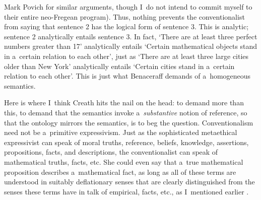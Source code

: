 \begin{artengenv}{Mark Povich}
\parencite*[][]{hale_reasons_2001} %
 for similar arguments, though I~do not intend to commit myself to their entire neo-Fregean program). Thus, nothing prevents the conventionalist from saying that sentence 2 has the logical form of sentence 3. This is analytic; sentence 2 analytically entails sentence 3. In fact, ‘There are at least three perfect numbers greater than 17' analytically entails ‘Certain mathematical objects stand in a~certain relation to each other', just as ‘There are at least three large cities older than New York' analytically entails ‘Certain cities stand in a~certain relation to each other'. This is just what Benaceraff demands of a~homogeneous semantics.

Here is where I~think Creath
\parencite*[][]{creath_benacerraf_1980} %
 hits the nail on the head: to demand more than this, to demand that the semantics invoke a~\textit{substantive} notion of reference, so that the ontology mirrors the semantics, is to beg the question. Conventionalism need not be a~primitive expressivism. Just as the sophisticated metaethical expressivist 
\parencites[e.g.,][]{blackburn_essays_1993}{kalderon_quasi-realism_2005}
 can speak of moral truths, reference, beliefs, knowledge, assertions, propositions, facts, and descriptions, the conventionalist can speak of mathematical truths, facts, etc. She could even say that a~true mathematical proposition describes a~mathematical fact, as long as all of these terms are understood in suitably deflationary senses that are clearly distinguished from the senses these terms have in talk of empirical, facts, etc., as I~mentioned earlier 
\parencites[][]{thomasson_norms_2020}[see also][]{baker_mathematical_2009}.%



\end{artengenv}
